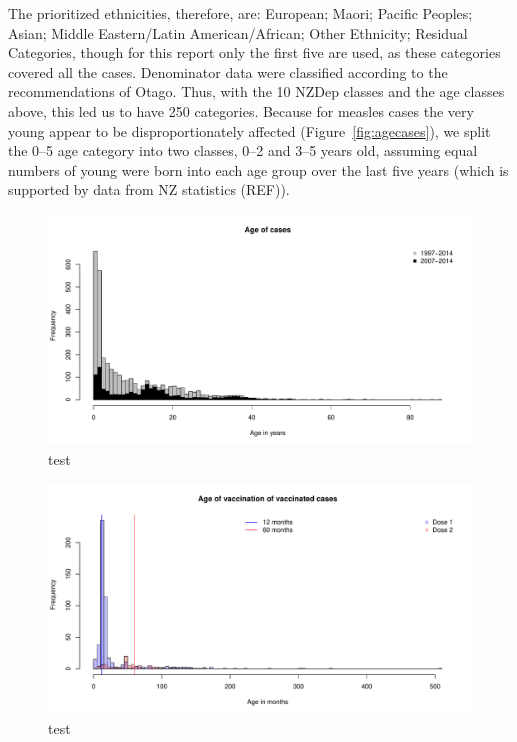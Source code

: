 \documentclass{article}
\begin{document}
The prioritized ethnicities, therefore, are:  European; Maori; Pacific Peoples; Asian; Middle Eastern/Latin American/African; Other Ethnicity; Residual Categories, though for this report only the first five are used, as these categories covered all the cases. Denominator data were classified according to the recommendations of Otago. Thus, with the 10 NZDep classes and the age classes above, this led us to have 250 categories. Because for measles cases the very young appear to be disproportionately affected (Figure~\ref{fig:agecases}), we split the 0--5 age category into two classes, 0--2 and 3--5 years old, assuming equal numbers of young were born into each age group over the last five years (which is supported by data from NZ statistics (REF)).


\begin{figure}[h!]
\begin{center}
\includegraphics{interimreport2-002}
\end{center}
\caption{test}
\label{fig:test}
\end{figure}


\begin{figure}[h!]
\begin{center}
\includegraphics{interimreport2-004}
\end{center}
\caption{test}
\label{fig:test}
\end{figure}
\end{document}
